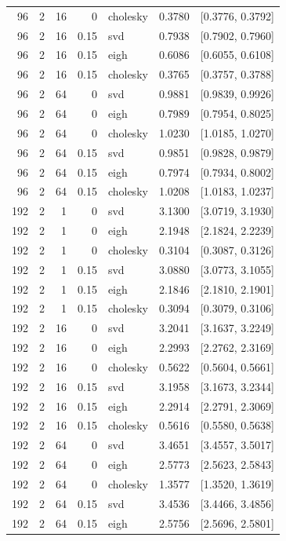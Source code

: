 \begin{tabular}{rrrrlrr}
96 & 2 & 16 & 0 & cholesky & 0.3780 & [0.3776, 0.3792] \\
96 & 2 & 16 & 0.15 & svd & 0.7938 & [0.7902, 0.7960] \\
96 & 2 & 16 & 0.15 & eigh & 0.6086 & [0.6055, 0.6108] \\
96 & 2 & 16 & 0.15 & cholesky & 0.3765 & [0.3757, 0.3788] \\
96 & 2 & 64 & 0 & svd & 0.9881 & [0.9839, 0.9926] \\
96 & 2 & 64 & 0 & eigh & 0.7989 & [0.7954, 0.8025] \\
96 & 2 & 64 & 0 & cholesky & 1.0230 & [1.0185, 1.0270] \\
96 & 2 & 64 & 0.15 & svd & 0.9851 & [0.9828, 0.9879] \\
96 & 2 & 64 & 0.15 & eigh & 0.7974 & [0.7934, 0.8002] \\
96 & 2 & 64 & 0.15 & cholesky & 1.0208 & [1.0183, 1.0237] \\
192 & 2 & 1 & 0 & svd & 3.1300 & [3.0719, 3.1930] \\
192 & 2 & 1 & 0 & eigh & 2.1948 & [2.1824, 2.2239] \\
192 & 2 & 1 & 0 & cholesky & 0.3104 & [0.3087, 0.3126] \\
192 & 2 & 1 & 0.15 & svd & 3.0880 & [3.0773, 3.1055] \\
192 & 2 & 1 & 0.15 & eigh & 2.1846 & [2.1810, 2.1901] \\
192 & 2 & 1 & 0.15 & cholesky & 0.3094 & [0.3079, 0.3106] \\
192 & 2 & 16 & 0 & svd & 3.2041 & [3.1637, 3.2249] \\
192 & 2 & 16 & 0 & eigh & 2.2993 & [2.2762, 2.3169] \\
192 & 2 & 16 & 0 & cholesky & 0.5622 & [0.5604, 0.5661] \\
192 & 2 & 16 & 0.15 & svd & 3.1958 & [3.1673, 3.2344] \\
192 & 2 & 16 & 0.15 & eigh & 2.2914 & [2.2791, 2.3069] \\
192 & 2 & 16 & 0.15 & cholesky & 0.5616 & [0.5580, 0.5638] \\
192 & 2 & 64 & 0 & svd & 3.4651 & [3.4557, 3.5017] \\
192 & 2 & 64 & 0 & eigh & 2.5773 & [2.5623, 2.5843] \\
192 & 2 & 64 & 0 & cholesky & 1.3577 & [1.3520, 1.3619] \\
192 & 2 & 64 & 0.15 & svd & 3.4536 & [3.4466, 3.4856] \\
192 & 2 & 64 & 0.15 & eigh & 2.5756 & [2.5696, 2.5801] \\

\end{tabular}
